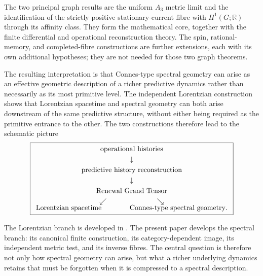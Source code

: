 \documentclass[11pt]{article}
\theoremstyle{definition}
\theoremstyle{remark}
\theoremstyle{definition}
\theoremstyle{remark}
\newcommand{\R}{\mathbb R}
\begin{document}
The two principal graph results are the uniform $A_3$ metric limit and the
identification of the strictly positive stationary-current fibre with
$H^1(G;\R)$ through its affinity class.  They form the mathematical core,
together with the finite differential and operational reconstruction theory.
The spin, rational-memory, and completed-fibre constructions are further
extensions, each with its own additional hypotheses; they are not needed for
those two graph theorems.

The resulting interpretation is that Connes-type spectral geometry can arise as
an effective geometric description of a richer predictive dynamics rather than
necessarily as its most primitive level.  The independent Lorentzian construction
\cite{PelissierRenewalSpacetime2026} shows that Lorentzian spacetime and spectral
geometry can both arise downstream of the same predictive structure, without
either being required as the primitive entrance to the other.  The two
constructions therefore lead to the schematic picture
\begin{equation}
\boxed{
\begin{array}{c}
\text{operational histories}\\[1mm]
\downarrow\\[1mm]
\text{predictive history reconstruction}\\[1mm]
\downarrow\\[1mm]
\text{Renewal Grand Tensor}\\[1mm]
\swarrow\hspace{2.5cm}\searrow\\[-1mm]
\text{Lorentzian spacetime}
\hspace{1.4cm}
\text{Connes-type spectral geometry}.
\end{array}}
\label{eq:intro-renewal-geometric-branches}
\end{equation}

The Lorentzian branch is developed in
\cite{PelissierRenewalSpacetime2026}.  The present paper develops the spectral
branch: its canonical finite construction, its category-dependent image, its
independent metric test, and its inverse fibres.  The central question is therefore
not only how spectral geometry can arise, but what a richer underlying dynamics
retains that must be forgotten when it is compressed to a spectral description.
\end{document}
